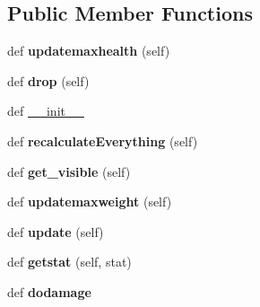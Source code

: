 \subsection*{Public Member Functions}
\begin{DoxyCompactItemize}
\item 
\hypertarget{classmonster__body_1_1_human_body_a8ca8658e36fca285a74f7ba34788b312}{}def {\bfseries updatemaxhealth} (self)\label{classmonster__body_1_1_human_body_a8ca8658e36fca285a74f7ba34788b312}

\item 
\hypertarget{classmonster__body_1_1_human_body_ae89d3384982af338f525dd7e81a19f69}{}def {\bfseries drop} (self)\label{classmonster__body_1_1_human_body_ae89d3384982af338f525dd7e81a19f69}

\item 
def \hyperlink{classmonster__body_1_1_human_body_a1964b8b013b4a90d0297b0fe762d2878}{\+\_\+\+\_\+init\+\_\+\+\_\+}
\item 
\hypertarget{classmonster__body_1_1_human_body_a5d7d74b13e753179b080c64e0251c0f5}{}def {\bfseries recalculate\+Everything} (self)\label{classmonster__body_1_1_human_body_a5d7d74b13e753179b080c64e0251c0f5}

\item 
\hypertarget{classmonster__body_1_1_human_body_a1905ab8ebc69b762d8f505b7a0cee7e2}{}def {\bfseries get\+\_\+visible} (self)\label{classmonster__body_1_1_human_body_a1905ab8ebc69b762d8f505b7a0cee7e2}

\item 
\hypertarget{classmonster__body_1_1_human_body_a7ff069898edeee2c8b1aef3abe82c9fc}{}def {\bfseries updatemaxweight} (self)\label{classmonster__body_1_1_human_body_a7ff069898edeee2c8b1aef3abe82c9fc}

\item 
\hypertarget{classmonster__body_1_1_human_body_a4d1d71a2e5e70400bebc0891a366aae3}{}def {\bfseries update} (self)\label{classmonster__body_1_1_human_body_a4d1d71a2e5e70400bebc0891a366aae3}

\item 
\hypertarget{classmonster__body_1_1_human_body_af57f3f8fdcafd9fb1d8c9616239d52fe}{}def {\bfseries getstat} (self, stat)\label{classmonster__body_1_1_human_body_af57f3f8fdcafd9fb1d8c9616239d52fe}

\item 
\hypertarget{classmonster__body_1_1_human_body_a7276cbe9d380ad95d80be70821a1b883}{}def {\bfseries dodamage}\label{classmonster__body_1_1_human_body_a7276cbe9d380ad95d80be70821a1b883}

\end{DoxyCompactItemize}
